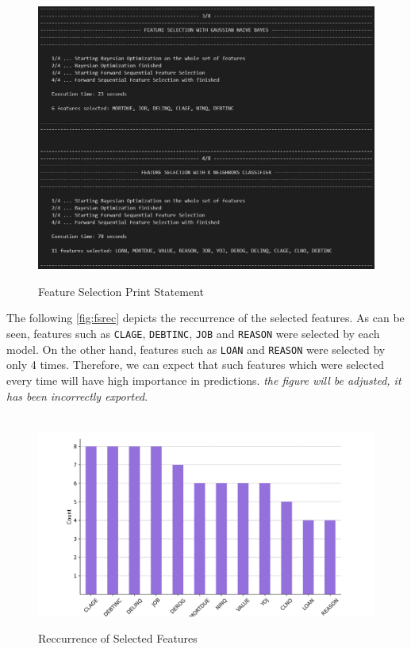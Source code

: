 \begin{figure}[H]
    \centering
    \caption{Feature Selection Print Statement}\vspace{0.5em}
    \label{fig:fsprint}\
    \includegraphics[width=140mm]{Figures/fs_print.jpg}
    \vspace{-1em}
\end{figure}


The following \autoref{fig:fsrec} depicts the reccurrence of the selected features. As can be seen, features such as \texttt{CLAGE}, \texttt{DEBTINC}, \texttt{JOB} and \texttt{REASON} were selected by each model. 
On the other hand, features such as \texttt{LOAN} and \texttt{REASON} were selected by only 4 times. Therefore, we can expect that such features which were selected every time will have high importance in predictions. \textit{the figure will be adjusted, it has been incorrectly exported}.

\begin{figure}[H]
    \centering
    \caption{Reccurrence of Selected Features}\vspace{0.5em}
    \label{fig:fsrec}\
    \includegraphics[width=150mm]{Figures/Recurrence_Selected_Features.jpg}
    \vspace{-1em}
\end{figure}


